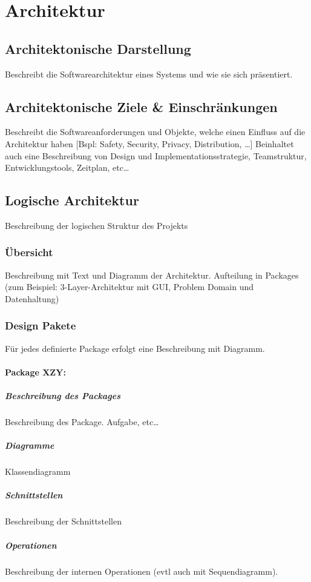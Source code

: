 \documentclass[a4paper,12pt,halfparskip,DIV14]{scrartcl}
\begin{document}


\section{Architektur} %
\label{sec:architektur}
\subsection{Architektonische Darstellung } %
\label{sub:architektonische_darstellung_}
Beschreibt die Softwarearchitektur eines Systems und wie sie sich präsentiert.

\subsection{Architektonische Ziele \& Einschränkungen} %
\label{sub:architektonische_ziele_einschränkungen}
Beschreibt die Softwareanforderungen und Objekte, welche einen Einfluss auf die Architektur haben [Bspl: Safety, Security, Privacy, Distribution, …] Beinhaltet auch eine Beschreibung von Design und Implementationsstrategie, Teamstruktur, Entwicklungstools, Zeitplan, etc…

\subsection{Logische Architektur} %
\label{sub:logische_architektur}
Beschreibung der logischen Struktur des Projekts
\subsubsection{Übersicht} %
\label{ssub:Übersicht}
Beschreibung mit Text und Diagramm der Architektur. Aufteilung in Packages (zum Beispiel: 3-Layer-Architektur mit  GUI, Problem Domain und Datenhaltung)

\subsubsection{Design Pakete} %
\label{ssub:design_pakete}
Für jedes definierte Package erfolgt eine Beschreibung mit Diagramm.
\paragraph{Package XZY:} %
\label{ssub:package_xzy}
\subparagraph{Beschreibung des Packages} %
\label{ssub:beschreibung_des_packages}
Beschreibung des Package. Aufgabe, etc…
\subparagraph{Diagramme} %
\label{ssub:diagramme}
Klassendiagramm
\subparagraph{Schnittstellen} %
\label{ssub:schnittstellen}
Beschreibung der Schnittstellen
\subparagraph{Operationen} %
\label{ssub:operationen}
Beschreibung der internen Operationen (evtl auch mit Sequendiagramm).
\end{document}

